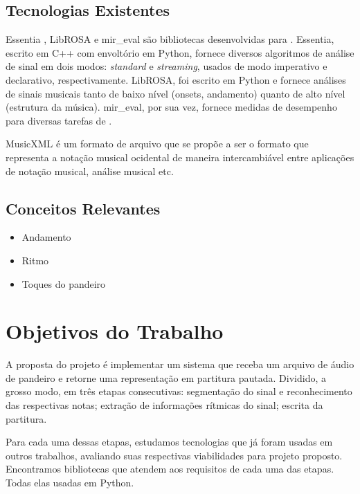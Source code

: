 \documentclass[
  dissertacao,
  brazil
]{ThesisPUC}
\begin{document}
\section{Tecnologias Existentes}
Essentia \cite{bogdanov2013essentia}, LibROSA \cite{mcfee2015librosaDesign} e mir\_eval \cite{raffel2014mir_eval} são bibliotecas desenvolvidas para \mir. Essentia, escrito em C++ com envoltório em Python, fornece diversos algoritmos de análise de sinal em dois modos: \emph{standard} e \emph{streaming}, usados de modo imperativo e declarativo, respectivamente. LibROSA, foi escrito em Python e fornece análises de sinais musicais tanto de baixo nível (onsets, andamento) quanto de alto nível (estrutura da música). mir\_eval, por sua vez, fornece medidas de desempenho para diversas tarefas de \MIR.

MusicXML \cite{good2001musicxml} é um formato de arquivo que se propõe a ser o formato que representa a notação musical ocidental de maneira intercambiável entre aplicações de notação musical, análise musical etc.

\section{Conceitos Relevantes}
\begin{itemize}
    \item Andamento
    \item Ritmo
    \item Toques do pandeiro
\end{itemize}



\chapter{Objetivos do Trabalho}
A proposta do projeto é implementar um sistema que receba um arquivo de áudio de pandeiro e retorne uma representação em partitura pautada. Dividido, a grosso modo, em três etapas consecutivas: segmentação do sinal e reconhecimento das respectivas notas; extração de informações rítmicas do sinal; escrita da partitura.

Para cada uma dessas etapas, estudamos tecnologias que já foram usadas em outros trabalhos, avaliando suas respectivas viabilidades para projeto proposto. Encontramos bibliotecas que atendem aos requisitos de cada uma das etapas. Todas elas usadas em Python. 
\end{document}
